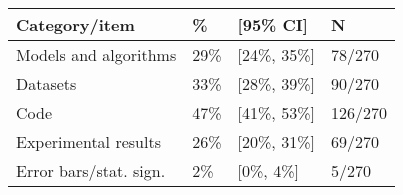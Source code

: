 \begin{tabular}{llll}
\hline
Category/item & \% & [95\% CI]  & N \\
\hline
Models and algorithms & 29\% & [24\%, 35\%] & 78/270\\
Datasets & 33\% & [28\%, 39\%] & 90/270\\
Code & 47\% & [41\%, 53\%] & 126/270\\
Experimental results & 26\% & [20\%, 31\%] & 69/270\\
Error bars/stat. sign.& 2\% & [0\%, 4\%] & 5/270\\
\hline
\end{tabular}
